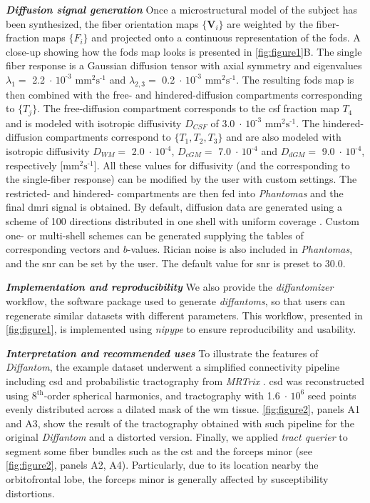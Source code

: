 \documentclass[english]{frontiers/frontiersSCNS} %
\newcommand{\e}[1]{\ensuremath{\;\cdot\,\text{10}^\text{#1}}}
\newcommand{\diffunits}{\ensuremath{\text{mm}^2\text{s}^{\text{-1}}}}
\begin{document}
\noindent\textbf{\textit{Diffusion signal generation\textcolon}\label{sec:data_dwi}} %
Once a microstructural model of the subject has been synthesized, the fiber orientation maps $\{\mathbf{V}_i\}$
  are weighted by the fiber-fraction maps $\{F_i\}$ and projected onto a continuous representation of
  the \glspl{fod}.
A close-up showing how the \glspl{fod} map looks is presented in \autoref{fig:figure1}B.
The single fiber response is a Gaussian diffusion tensor with axial symmetry and eigenvalues $\lambda_1=$ 2.2\e{-3}
  \diffunits{} and $\lambda_{2,3}=$ 0.2\e{-3} \diffunits{}.
The resulting \glspl{fod} map is then combined with the free- and hindered-diffusion compartments corresponding to $\{T_j\}$.
The free-diffusion compartment corresponds to the \gls*{csf} fraction map $T_4$ and is modeled with isotropic
  diffusivity $D_{CSF}$ of 3.0\e{-3} \diffunits{}.
The hindered-diffusion compartments correspond to $\{T_1,T_2,T_3\}$ and are also modeled with isotropic diffusivity
  $D_{WM} =$ 2.0\e{-4}, $D_{cGM} =$ 7.0\e{-4} and $D_{dGM} =$ 9.0\e{-4}, respectively [\diffunits{}].
All these values for diffusivity (and the corresponding to the single-fiber response) can be modified by the user with
  custom settings.
The restricted- and hindered- compartments are then fed into \emph{Phantomas} \citep{caruyer_phantomas_2014}
  and the final \gls*{dmri} signal is obtained.
By default, diffusion data are generated using a scheme of 100 directions distributed in one shell with uniform
  coverage \citep{caruyer_design_2013}.
Custom one- or multi-shell schemes can be generated supplying the tables of corresponding vectors and $b$-values.
Rician noise is also included in \emph{Phantomas}, and the \gls*{snr} can be set by the user.
The default value for \gls*{snr} is preset to 30.0.


\noindent\textbf{\textit{Implementation and reproducibility\textcolon}\label{sec:data_workflow}} %
We also provide the \emph{diffantomizer} workflow, the software package used to generate \emph{diffantoms}, so
  that users can regenerate similar datasets with different parameters.
This workflow, presented in \autoref{fig:figure1}, is implemented using
  \emph{nipype} \citep{gorgolewski_nipype_2011} to ensure reproducibility and usability.

\noindent\textbf{\textit{Interpretation and recommended uses\textcolon}\label{sec:data_use}} %
To illustrate the features of \emph{Diffantom}, the example dataset underwent a simplified
  connectivity pipeline including \gls*{csd} and probabilistic tractography from
  \emph{MRTrix} \citep{tournier_mrtrix_2012}.
\Gls*{csd} was reconstructed using 8$^\text{th}$-order spherical harmonics, and tractography with 1.6\e{6}
  seed points evenly distributed across a dilated mask of the \gls*{wm} tissue.
\autoref{fig:figure2}, panels A1 and A3, show the result of the tractography obtained with such pipeline for
  the original \emph{Diffantom} and a distorted version.
Finally, we applied \emph{tract querier} \citep{wassermann_on_2013} to segment some fiber bundles such
  as the \gls*{cst} and the forceps minor (see \autoref{fig:figure2}, panels A2, A4).
Particularly, due to its location nearby the orbitofrontal lobe, the forceps minor is generally affected by
  susceptibility distortions.
\end{document}
